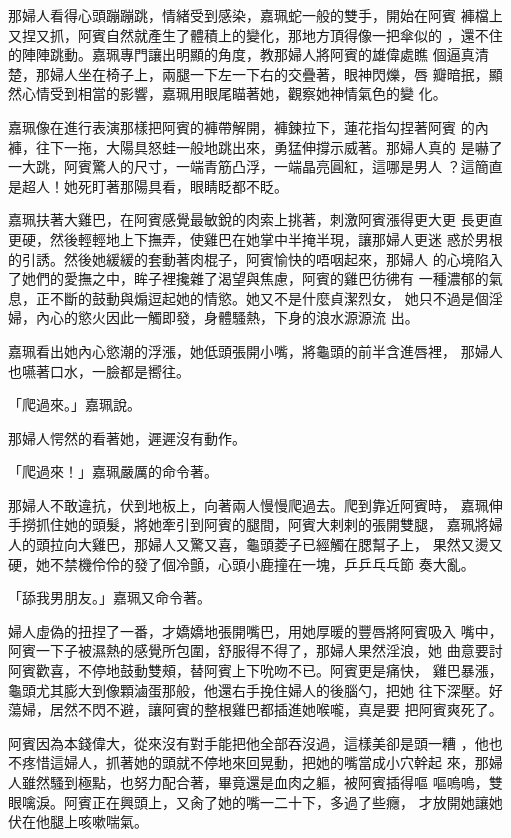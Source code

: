 那婦人看得心頭蹦蹦跳，情緒受到感染，嘉珮蛇一般的雙手，開始在阿賓
褲檔上又捏又抓，阿賓自然就產生了體積上的變化，那地方頂得像一把傘似的
，還不住的陣陣跳動。嘉珮專門讓出明顯的角度，教那婦人將阿賓的雄偉處瞧
個逼真清楚，那婦人坐在椅子上，兩腿一下左一下右的交疊著，眼神閃爍，唇
瓣暗抿，顯然心情受到相當的影響，嘉珮用眼尾瞄著她，觀察她神情氣色的變
化。

嘉珮像在進行表演那樣把阿賓的褲帶解開，褲鍊拉下，蓮花指勾捏著阿賓
的內褲，往下一拖，大陽具怒蛙一般地跳出來，勇猛伸撐示威著。那婦人真的
是嚇了一大跳，阿賓驚人的尺寸，一端青筋凸浮，一端晶亮圓紅，這哪是男人
？這簡直是超人！她死盯著那陽具看，眼睛眨都不眨。

嘉珮扶著大雞巴，在阿賓感覺最敏銳的肉索上挑著，刺激阿賓漲得更大更
長更直更硬，然後輕輕地上下撫弄，使雞巴在她掌中半掩半現，讓那婦人更迷
惑於男根的引誘。然後她緩緩的套動著肉棍子，阿賓愉快的唔咽起來，那婦人
的心境陷入了她們的愛撫之中，眸子裡攙雜了渴望與焦慮，阿賓的雞巴彷彿有
一種濃郁的氣息，正不斷的鼓動與煽逗起她的情慾。她又不是什麼貞潔烈女，
她只不過是個淫婦，內心的慾火因此一觸即發，身體騷熱，下身的浪水源源流
出。

嘉珮看出她內心慾潮的浮漲，她低頭張開小嘴，將龜頭的前半含進唇裡，
那婦人也嚥著口水，一臉都是嚮往。

「爬過來。」嘉珮說。

那婦人愕然的看著她，遲遲沒有動作。

「爬過來！」嘉珮嚴厲的命令著。

那婦人不敢違抗，伏到地板上，向著兩人慢慢爬過去。爬到靠近阿賓時，
嘉珮伸手撈抓住她的頭髮，將她牽引到阿賓的腿間，阿賓大剌剌的張開雙腿，
嘉珮將婦人的頭拉向大雞巴，那婦人又驚又喜，龜頭菱子已經觸在腮幫子上，
果然又燙又硬，她不禁機伶伶的發了個冷顫，心頭小鹿撞在一塊，乒乒乓乓節
奏大亂。

「舔我男朋友。」嘉珮又命令著。

婦人虛偽的扭捏了一番，才嬌嬌地張開嘴巴，用她厚暖的豐唇將阿賓吸入
嘴中，阿賓一下子被濕熱的感覺所包圍，舒服得不得了，那婦人果然淫浪，她
曲意要討阿賓歡喜，不停地鼓動雙頰，替阿賓上下吮吻不已。阿賓更是痛快，
雞巴暴漲，龜頭尤其膨大到像顆滷蛋那般，他還右手挽住婦人的後腦勺，把她
往下深壓。好蕩婦，居然不閃不避，讓阿賓的整根雞巴都插進她喉嚨，真是要
把阿賓爽死了。

阿賓因為本錢偉大，從來沒有對手能把他全部吞沒過，這樣美卻是頭一糟
，他也不疼惜這婦人，抓著她的頭就不停地來回晃動，把她的嘴當成小穴幹起
來，那婦人雖然騷到極點，也努力配合著，畢竟還是血肉之軀，被阿賓插得嘔
嘔嗚嗚，雙眼噙淚。阿賓正在興頭上，又肏了她的嘴一二十下，多過了些癮，
才放開她讓她伏在他腿上咳嗽喘氣。


